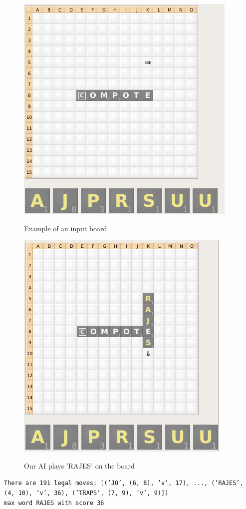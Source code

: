 \documentclass[12pt]{article}
\begin{document}
\begin{figure}[h]
    \centering
  \includegraphics[scale=0.4]{../images/exampleboard}
  \caption{Example of an input board}
  \endminipage
      \centering
  \includegraphics[scale=0.4]{../images/exampleplay}\\
   \caption{Our AI plays 'RAJES' on the board}
  \endminipage{}
\end{figure}

\noindent
\texttt{There are 191 legal moves: [('JO', (6, 8), 'v', 17), ...,  ('RAJES', (4, 10), 'v', 36), ('TRAPS', (7, 9), 'v', 9)])\\
max word RAJES with score 36}
\end{document}
